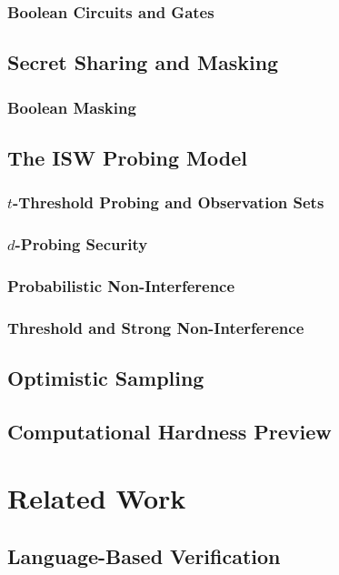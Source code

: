 \documentclass{report}
\begin{document}
  \subsection{Boolean Circuits and Gates}
\section{Secret Sharing and Masking}
  \subsection{Boolean Masking}
\section{The ISW Probing Model}
  \subsection{$t$-Threshold Probing and Observation Sets}
  \subsection{$d$-Probing Security}
  \subsection{Probabilistic Non-Interference}
  \subsection{Threshold and Strong Non-Interference}
\section{Optimistic Sampling}
\section{Computational Hardness Preview}

\chapter{Related Work}
\section{Language-Based Verification} %
\end{document}
